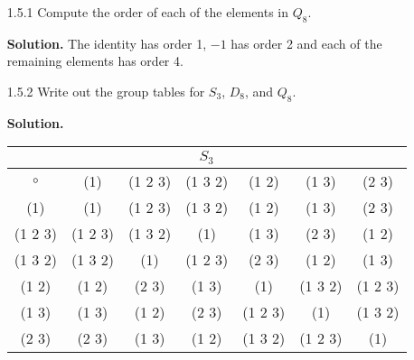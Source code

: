 \begin{enumerate}
   \item[1.5.1]   Compute the order of each of the elements in $Q_8$.

      \textbf{Solution.} The identity has order 1, $-1$ has order 2 and each of
      the remaining elements has order 4.      
   \item[1.5.2]   Write out the group tables for $S_3$, $D_8$, and $Q_8$.

      \textbf{Solution.}
      \begin{center}
         \begin{tabular}{@{}|c|c|c|c|c|c|c|@{}} \hline
            \multicolumn{7}{|c|}{$S_3$} \\ \hline
            $\circ$ & (1) & (1 2 3) & (1 3 2) & (1 2) & (1 3) & (2 3) \\ \hline
            (1) & (1) & (1 2 3) & (1 3 2) & (1 2) & (1 3) & (2 3) \\ \hline
            (1 2 3) & (1 2 3) & (1 3 2) & (1) & (1 3) & (2 3) & (1 2) \\ \hline
            (1 3 2) & (1 3 2) & (1) & (1 2 3) & (2 3) & (1 2) & (1 3)  \\ \hline
            (1 2) & (1 2) & (2 3) & (1 3) & (1) & (1 3 2) & (1 2 3) \\ \hline
            (1 3) & (1 3) & (1 2) & (2 3) & (1 2 3) & (1) & (1 3 2) \\ \hline
            (2 3) & (2 3) & (1 3) & (1 2) & (1 3 2) & (1 2 3) & (1) \\ \hline
         \end{tabular}
      \end{center}


\end{enumerate}
